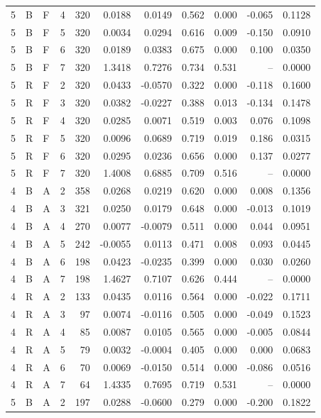 \documentclass[10pt,a4paper]{article}
\begin{document}
\begin{landscape}
\begin{longtable}{rllrrrrrrrr}
5 & B & F & 4 & 320 & 0.0188 & 0.0149 & 0.562 & 0.000 & -0.065 & 0.1128 \\
5 & B & F & 5 & 320 & 0.0034 & 0.0294 & 0.616 & 0.009 & -0.150 & 0.0910 \\
5 & B & F & 6 & 320 & 0.0189 & 0.0383 & 0.675 & 0.000 & 0.100 & 0.0350 \\
5 & B & F & 7 & 320 & 1.3418 & 0.7276 & 0.734 & 0.531 & -- & 0.0000 \\
5 & R & F & 2 & 320 & 0.0433 & -0.0570 & 0.322 & 0.000 & -0.118 & 0.1600 \\
5 & R & F & 3 & 320 & 0.0382 & -0.0227 & 0.388 & 0.013 & -0.134 & 0.1478 \\
5 & R & F & 4 & 320 & 0.0285 & 0.0071 & 0.519 & 0.003 & 0.076 & 0.1098 \\
5 & R & F & 5 & 320 & 0.0096 & 0.0689 & 0.719 & 0.019 & 0.186 & 0.0315 \\
5 & R & F & 6 & 320 & 0.0295 & 0.0236 & 0.656 & 0.000 & 0.137 & 0.0277 \\
5 & R & F & 7 & 320 & 1.4008 & 0.6885 & 0.709 & 0.516 & -- & 0.0000 \\
4 & B & A & 2 & 358 & 0.0268 & 0.0219 & 0.620 & 0.000 & 0.008 & 0.1356 \\
4 & B & A & 3 & 321 & 0.0250 & 0.0179 & 0.648 & 0.000 & -0.013 & 0.1019 \\
4 & B & A & 4 & 270 & 0.0077 & -0.0079 & 0.511 & 0.000 & 0.044 & 0.0951 \\
4 & B & A & 5 & 242 & -0.0055 & 0.0113 & 0.471 & 0.008 & 0.093 & 0.0445 \\
4 & B & A & 6 & 198 & 0.0423 & -0.0235 & 0.399 & 0.000 & 0.030 & 0.0260 \\
4 & B & A & 7 & 198 & 1.4627 & 0.7107 & 0.626 & 0.444 & -- & 0.0000 \\
4 & R & A & 2 & 133 & 0.0435 & 0.0116 & 0.564 & 0.000 & -0.022 & 0.1711 \\
4 & R & A & 3 & 97 & 0.0074 & -0.0116 & 0.505 & 0.000 & -0.049 & 0.1523 \\
4 & R & A & 4 & 85 & 0.0087 & 0.0105 & 0.565 & 0.000 & -0.005 & 0.0844 \\
4 & R & A & 5 & 79 & 0.0032 & -0.0004 & 0.405 & 0.000 & 0.000 & 0.0683 \\
4 & R & A & 6 & 70 & 0.0069 & -0.0150 & 0.514 & 0.000 & -0.086 & 0.0516 \\
4 & R & A & 7 & 64 & 1.4335 & 0.7695 & 0.719 & 0.531 & -- & 0.0000 \\
5 & B & A & 2 & 197 & 0.0288 & -0.0600 & 0.279 & 0.000 & -0.200 & 0.1822 \\

\end{longtable}
\end{landscape}
\end{document}
